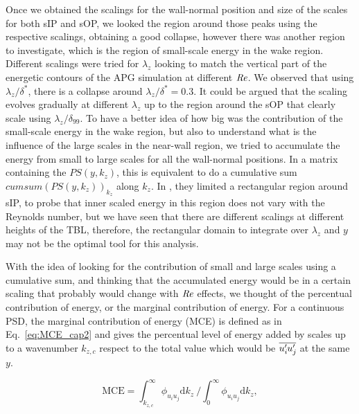 Once we obtained the scalings for the wall-normal position and size of the scales for both sIP and sOP, we looked the region around those peaks using the respective scalings, obtaining a good collapse, however there was another region to investigate, which is the region of small-scale energy in the wake region.
Different scalings were tried for $\lambda_z$ looking to match the vertical part of the energetic contours of the APG simulation at different $\mbox{\textit{Re}}$.
We observed that using $\lambda_z/\delta^*$, there is a collapse around $\lambda_z/\delta^*=0.3$. It could be argued that the scaling evolves gradually at different $\lambda_z$ up to the region around the sOP that clearly scale using $\lambda_z/\delta_{99}$.
To have a better idea of how big was the contribution of the small-scale energy in the wake region, but also to understand what is the influence of the large scales in the near-wall region, we tried to accumulate the energy from small to large scales for all the wall-normal positions. In a matrix containing the $PS(y,k_z)$, this is equivalent to do a cumulative sum $cumsum(PS(y,k_z))_{k_z}$ along $k_z$.
In \cite{EAmorZPG}, they limited a rectangular region around sIP, to probe that inner scaled energy in this region does not vary with the Reynolds number, but we have seen that there are different scalings at different heights of the TBL, therefore, the rectangular domain to integrate over $\lambda_z$ and $y$ may not be the optimal tool for this analysis.

With the idea of looking for the contribution of small and large scales using a cumulative sum, and thinking that the accumulated energy would be in a certain scaling that probably would change with $\mbox{\textit{Re}}$ effects, we thought of the percentual contribution of energy, or the marginal contribution of energy.
For a continuous PSD, the marginal contribution of energy (MCE) is defined as in Eq.~\ref{eq:MCE_cap2} and gives the percentual level of energy added by scales up to a wavenumber $k_{z,c}$ respect to the total value which would be $\overline{u_i^{\prime}\mkern-1.2mu u_j^{\prime}\mkern-1.2mu}$ at the same $y$.

\begin{equation}
\mathrm{MCE} = \int_{k_{z,c}}^{\infty} \phi_{u_iu_j} \mathrm{d} k_z \ \bigg/ \int_{0}^{\infty} \phi_{u_iu_j} \mathrm{d} k_z,
\label{eq:MCE_cap2}
\end{equation}

